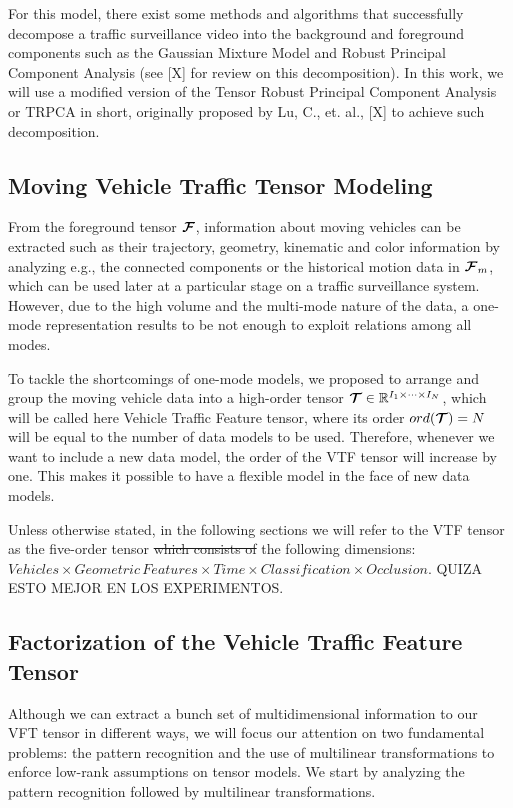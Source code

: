 \documentclass[sensors,article,submit,moreauthors,pdftex]{Definitions/mdpi}
\newcommand{\mathten}[1]{\boldsymbol{\mathbf{\mathcal{\MakeUppercase{#1}}}}}
\providecommand{\DIFadd}[1]{{\protect\color{blue}\uwave{#1}}} %
\providecommand{\DIFdel}[1]{{\protect\color{red}\sout{#1}}}                      %
\providecommand{\DIFaddbegin}{} %
\providecommand{\DIFaddend}{} %
\providecommand{\DIFdelbegin}{} %
\providecommand{\DIFdelend}{} %
\begin{document}
For this model, there exist some methods and algorithms that successfully decompose a traffic surveillance video into the background and foreground components such as the Gaussian Mixture Model and Robust Principal Component Analysis (see [X] for review on this decomposition). In this work, we will use a modified version of the Tensor Robust Principal Component Analysis or TRPCA in short, originally proposed by Lu, C., et. al., [X] to achieve such decomposition.

\subsection{Moving Vehicle Traffic Tensor Modeling}

From the foreground tensor $\mathten{F}$, information about moving vehicles can be extracted such as their trajectory, geometry, kinematic and color information by analyzing e.g., the connected components or the historical motion data in $\mathten{F}_m$, which can be used later at a particular stage on a traffic surveillance system. However, due to the high volume and the multi-mode nature of the data, a one-mode representation results to be not enough to exploit relations among all modes. 

To tackle the shortcomings of one-mode models, we proposed to arrange and group the moving vehicle data into a high-order tensor $\mathten{T} \in \mathbb{R}^{I_1 \times \cdots \times I_N}$, which will be called here Vehicle Traffic Feature tensor, where its order $ord(\mathten{T}) = N$ will be equal to the number of data models to be used. Therefore, whenever we want to include a new data model, the order of the VTF tensor will increase by one. This makes it possible to have a flexible model in the face of new data models. 

Unless otherwise stated, in the following sections we will refer to the VTF tensor as the five-order tensor \DIFdelbegin \DIFdel{which consists of }\DIFdelend \DIFaddbegin \DIFadd{with }\DIFaddend the following dimensions: $Vehicles \times Geometric\,Features \times Time \times Classification \times Occlusion$. QUIZA ESTO MEJOR EN LOS EXPERIMENTOS.


\subsection{Factorization of the Vehicle Traffic Feature Tensor}
Although we can extract a bunch set of multidimensional information to our VFT tensor in different ways, we will focus our attention on two fundamental problems: the pattern recognition and the use of multilinear transformations to enforce low-rank assumptions on tensor models. We start by analyzing the pattern recognition followed by multilinear transformations.
\end{document}
